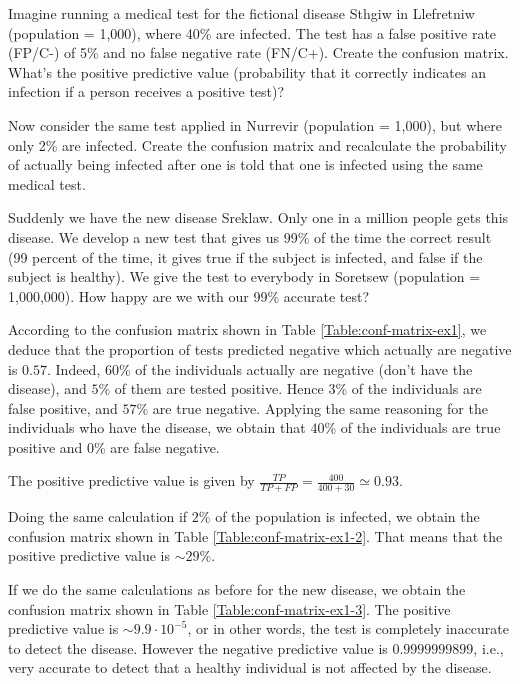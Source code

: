 \documentclass[fontsize=12pt, usenames, dvipsnames, headinclude, headsepline, footinclude, footsepline]{scrartcl}
\title{\normalfont{\bfseries{Machine Learning: Homework 8}}}
\author{Laurent \textsc{Hayez}}
\date{\today}
\begin{document}
\renewcommand{\labelitemi}{\textbullet}



\maketitle




\begin{exo}
  Imagine running a medical test for the fictional disease Sthgiw in Llefretniw (population = 1,000), where
  40\% are infected. The test has a false positive rate (FP/C-) of 5\% and no false negative rate
  (FN/C+). Create the confusion matrix. What’s the positive predictive value (probability that it correctly
  indicates an infection if a person receives a positive test)?  

  Now consider the same test applied in Nurrevir (population = 1,000), but where only 2\% are infected. Create
  the confusion matrix and recalculate the probability of actually being infected after one is told that one
  is infected using the same medical test.  

  Suddenly we have the new disease Sreklaw. Only one in a million people gets this disease. We develop a new
  test that gives us 99\% of the time the correct result (99 percent of the time, it gives true if the subject
  is infected, and false if the subject is healthy). We give the test to everybody in Soretsew (population =
  1,000,000). How happy are we with our 99\% accurate test?
\end{exo}

  \begin{sol}
    According to the confusion matrix shown in Table \ref{Table:conf-matrix-ex1}, we deduce that the
    proportion of tests predicted negative which actually are negative is $0.57$. Indeed, $60$\% of the
    individuals actually are negative (don't have the disease), and $5\%$ of them are tested positive. Hence
    $3$\% of the individuals are false positive, and $57$\% are true negative. Applying the same reasoning for
    the individuals who have the disease, we obtain that $40$\% of the individuals are true positive and $0$\%
    are false negative. 

    The positive predictive value is given by $\frac{TP}{TP + FP} = \frac{400}{400 + 30} \simeq 0.93$.

    Doing the same calculation if $2$\% of the population is infected, we obtain the confusion matrix shown in
    Table \ref{Table:conf-matrix-ex1-2}. That means that the positive predictive value is $\sim 29$\%.

    If we do the same calculations as before for the new disease, we obtain the confusion matrix shown in
    Table \ref{Table:conf-matrix-ex1-3}. The positive predictive value is $\sim 9.9 \cdot 10^{-5}$, or in
    other words, the test is completely inaccurate to detect the disease. However the negative predictive
    value is $0.9999999899$, i.e., very accurate to detect that a healthy individual is not affected by the
    disease. 
  \end{sol}
\end{document}
